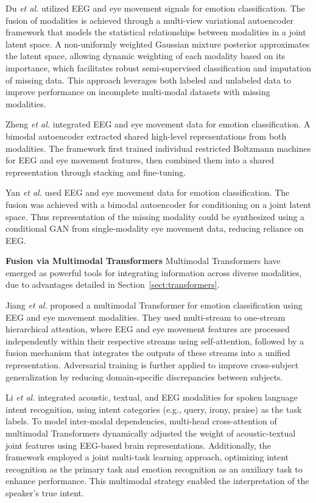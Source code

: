 \documentclass[journal]{IEEEtran}
\begin{document}
Du \emph{et al.} \cite{Du2018b} utilized EEG and eye movement signals for emotion classification. The fusion of modalities is achieved through a multi-view variational autoencoder framework that models the statistical relationships between modalities in a joint latent space. A non-uniformly weighted Gaussian mixture posterior approximates the latent space, allowing dynamic weighting of each modality based on its importance, which facilitates robust semi-supervised classification and imputation of missing data. This approach leverages both labeled and unlabeled data to improve performance on incomplete multi-modal datasets with missing modalities.

Zheng \emph{et al.} \cite{Zheng2019} integrated EEG and eye movement data for emotion classification. A bimodal autoencoder extracted shared high-level representations from both modalities. The framework first trained individual restricted Boltzmann machines for EEG and eye movement features, then combined them into a shared representation through stacking and fine-tuning.

Yan \emph{et al.} \cite{Yan2021} used EEG and eye movement data for emotion classification. The fusion was achieved with a bimodal autoencoder for conditioning on a joint latent space. Thus representation of the missing modality could be synthesized using a conditional GAN from single-modality eye movement data, reducing reliance on EEG.

\textbf{Fusion via Multimodal Transformers} Multimodal Transformers have emerged as powerful tools for integrating information across diverse modalities, due to advantages detailed in Section~\ref{sect:transformers}.

Jiang \emph{et al.} \cite{Jiang2023} proposed a multimodal Transformer for emotion classification using EEG and eye movement modalities. They used multi-stream to one-stream hierarchical attention, where EEG and eye movement features are processed independently within their respective streams using self-attention, followed by a fusion mechanism that integrates the outputs of these streams into a unified representation. Adversarial training is further applied to improve cross-subject generalization by reducing domain-specific discrepancies between subjects.

Li \emph{et al.} \cite{Li2024b} integrated acoustic, textual, and EEG modalities for spoken language intent recognition, using intent categories (e.g., query, irony, praise) as the task labels. To model inter-modal dependencies, multi-head cross-attention of multimodal Transformers dynamically adjusted the weight of acoustic-textual joint features using EEG-based brain representations. Additionally, the framework employed a joint multi-task learning approach, optimizing intent recognition as the primary task and emotion recognition as an auxiliary task to enhance performance. This multimodal strategy enabled the interpretation of the speaker’s true intent.
\end{document}
